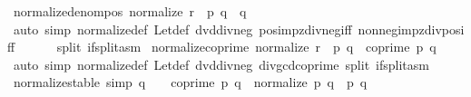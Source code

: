 \begin{isabellebody}
\ normalize{\isacharunderscore}{\kern0pt}denom{\isacharunderscore}{\kern0pt}pos{\isacharcolon}{\kern0pt}\ {\isachardoublequoteopen}normalize\ r\ {\isacharequal}{\kern0pt}\ {\isacharparenleft}{\kern0pt}p{\isacharcomma}{\kern0pt}\ q{\isacharparenright}{\kern0pt}\ {\isasymLongrightarrow}\ q\ {\isachargreater}{\kern0pt}\ {}{\isachardoublequoteclose}\isanewline
%
\isadelimproof
\ \ %
\endisadelimproof
%
\isatagproof
{}\isamarkupfalse%
\ {\isacharparenleft}{\kern0pt}auto\ simp{\isacharcolon}{\kern0pt}\ normalize{\isacharunderscore}{\kern0pt}def\ Let{\isacharunderscore}{\kern0pt}def\ dvd{\isacharunderscore}{\kern0pt}div{\isacharunderscore}{\kern0pt}neg\ pos{\isacharunderscore}{\kern0pt}imp{\isacharunderscore}{\kern0pt}zdiv{\isacharunderscore}{\kern0pt}neg{\isacharunderscore}{\kern0pt}iff\ nonneg{}{\isacharunderscore}{\kern0pt}imp{\isacharunderscore}{\kern0pt}zdiv{\isacharunderscore}{\kern0pt}pos{\isacharunderscore}{\kern0pt}iff\isanewline
\ \ \ \ \ \ split{\isacharcolon}{\kern0pt}\ if{\isacharunderscore}{\kern0pt}split{\isacharunderscore}{\kern0pt}asm{\isacharparenright}{\kern0pt}%
\endisatagproof
{\isafoldproof}%
%
\isadelimproof
\isanewline
%
\endisadelimproof
\isanewline
{}\isamarkupfalse%
\ normalize{\isacharunderscore}{\kern0pt}coprime{\isacharcolon}{\kern0pt}\ {\isachardoublequoteopen}normalize\ r\ {\isacharequal}{\kern0pt}\ {\isacharparenleft}{\kern0pt}p{\isacharcomma}{\kern0pt}\ q{\isacharparenright}{\kern0pt}\ {\isasymLongrightarrow}\ coprime\ p\ q{\isachardoublequoteclose}\isanewline
%
\isadelimproof
\ \ %
\endisadelimproof
%
\isatagproof
{}\isamarkupfalse%
\ {\isacharparenleft}{\kern0pt}auto\ simp{\isacharcolon}{\kern0pt}\ normalize{\isacharunderscore}{\kern0pt}def\ Let{\isacharunderscore}{\kern0pt}def\ dvd{\isacharunderscore}{\kern0pt}div{\isacharunderscore}{\kern0pt}neg\ div{\isacharunderscore}{\kern0pt}gcd{\isacharunderscore}{\kern0pt}coprime\ split{\isacharcolon}{\kern0pt}\ if{\isacharunderscore}{\kern0pt}split{\isacharunderscore}{\kern0pt}asm{\isacharparenright}{\kern0pt}%
\endisatagproof
{\isafoldproof}%
%
\isadelimproof
\isanewline
%
\endisadelimproof
\isanewline
{}\isamarkupfalse%
\ normalize{\isacharunderscore}{\kern0pt}stable\ {\isacharbrackleft}{\kern0pt}simp{\isacharbrackright}{\kern0pt}{\isacharcolon}{\kern0pt}\ {\isachardoublequoteopen}q\ {\isachargreater}{\kern0pt}\ {}\ {\isasymLongrightarrow}\ coprime\ p\ q\ {\isasymLongrightarrow}\ normalize\ {\isacharparenleft}{\kern0pt}p{\isacharcomma}{\kern0pt}\ q{\isacharparenright}{\kern0pt}\ {\isacharequal}{\kern0pt}\ {\isacharparenleft}{\kern0pt}p{\isacharcomma}{\kern0pt}\ q{\isacharparenright}{\kern0pt}{\isachardoublequoteclose}\isanewline

\end{isabellebody}
